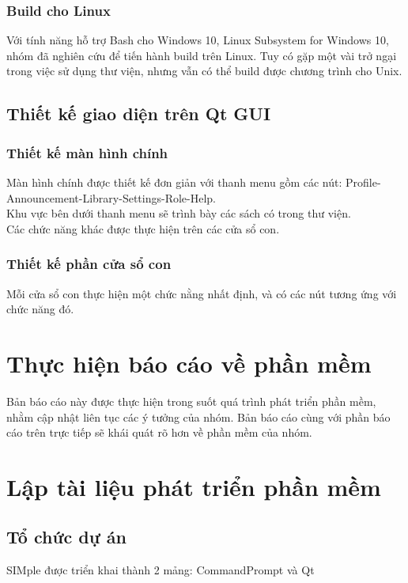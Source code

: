 \documentclass[12pt,a4paper]{report}
\begin{document}
			\subsubsection{Build cho Linux}

			Với tính năng hỗ trợ Bash cho Windows 10, Linux Subsystem for Windows 10, nhóm đã nghiên cứu để tiến hành build trên Linux. Tuy có gặp một vài trở ngại trong việc sử dụng thư viện, nhưng vẫn có thể build được chương trình cho Unix.
		\subsection{Thiết kế giao diện trên Qt GUI}
			\subsubsection{Thiết kế màn hình chính}
			Màn hình chính được thiết kế đơn giản với thanh menu gồm các nút: Profile-Announcement-Library-Settings-Role-Help.\\
			Khu vực bên dưới thanh menu sẽ trình bày các sách có trong thư viện.\\
			Các chức năng khác được thực hiện trên các cửa sổ con.\\
			\subsubsection{Thiết kế phần cửa sổ con}
			Mỗi cửa sổ con thực hiện một chức nằng nhất định, và có các nút tương ứng với chức năng đó.\\
	\section{Thực hiện báo cáo về phần mềm}
		Bản báo cáo này được thực hiện trong suốt quá trình phát triển phần mềm, nhằm cập nhật liên tục các ý tưởng của nhóm. Bản báo cáo cùng với phần báo cáo trên trực tiếp sẽ khái quát rõ hơn về phần mềm của nhóm.
	\section{Lập tài liệu phát triển phần mềm}
		\subsection{Tổ chức dự án}
		SIMple được triển khai thành 2 mảng: CommandPrompt và Qt
\end{document}

